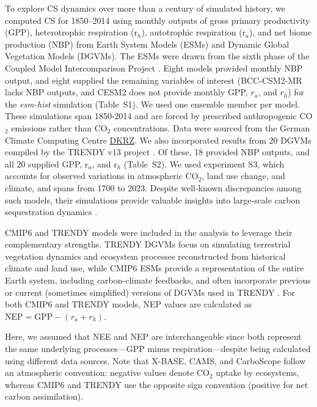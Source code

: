 \documentclass[ProofPDF]{./Styles/Jnls-Template-V3}
\begin{document}
To explore CS dynamics over more than a century of simulated history, we computed CS for 1850--2014 using monthly outputs of gross primary productivity (GPP), heterotrophic respiration (r$_h$), autotrophic respiration (r$_a$), and net biome production (NBP) from Earth System Models (ESMs) and Dynamic Global Vegetation Models (DGVMs). The ESMs were drawn from the sixth phase of the Coupled Model Intercomparison Project \citep[CMIP6; ][]{Eyring2016}. Eight models provided monthly NBP output, and eight supplied the remaining variables of interest (BCC-CSM2-MR lacks NBP outputs, and CESM2 does not provide monthly GPP, $r_a$, and $r_h$) for the {\it esm-hist} simulation (Table~S1). We used one ensemble member per model. These simulations span 1850-2014 and are forced by prescribed anthropogenic CO$_2$ emissions rather than CO$_2$ concentrations. Data were sourced from the German Climate Computing Centre \hyperlink{https://cmip-data-pool.dkrz.de/CMIP6-Data-Pool.html}{DKRZ}. We also incorporated results from 20 DGVMs compiled by the TRENDY v13 project \citep{Sitch2024}. Of these, 18 provided NBP outputs, and all 20 supplied GPP, r$_a$, and r$_h$ (Table~S2). We used experiment S3, which accounts for observed variations in atmospheric CO$_2$, land use change, and climate, and spans from 1700 to 2023. Despite well‑known discrepancies among such models, their simulations provide valuable insights into large‑scale carbon sequestration dynamics \citep{Gier2024,Sitch2024}.



CMIP6 and TRENDY models were included in the analysis to leverage their complementary strengths. TRENDY DGVMs focus on simulating terrestrial vegetation dynamics and ecosystem processes reconstructed from historical climate and land use, while CMIP6 ESMs provide a representation of the entire Earth system, including carbon-climate feedbacks, and often incorporate previous or current (sometimes simplified) versions of DGVMs used in TRENDY \citep{Argles2022,Weng2022}. For both CMIP6 and TRENDY models, NEP values are calculated as $\mathrm{NEP}=\mathrm{GPP}-(r_a+r_h)$.

Here, we assumed that NEE and NEP are interchangeable since both represent the same underlying processes—GPP minus respiration—despite being calculated using different data sources. Note that X-BASE, CAMS, and CarboScope follow an atmospheric convention: negative values denote CO$_2$ uptake by ecosystems, whereas CMIP6 and TRENDY use the opposite sign convention (positive for net carbon assimilation).
\end{document}
